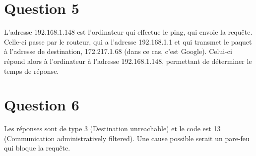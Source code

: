 \section{Question 5}
L'adresse 192.168.1.148 est l'ordinateur qui effectue le ping, qui envoie la requête. Celle-ci passe par le routeur, qui a l'adresse 192.168.1.1 et qui transmet le paquet à l'adresse de destination, 172.217.1.68 (dans ce cas, c'est Google). Celui-ci répond alors à l'ordinateur à l'adresse 192.168.1.148, permettant de déterminer le temps de réponse.
\section{Question 6}
Les réponses sont de type 3 (Destination unreachable) et le code est 13 (Communication administratively filtered).
Une cause possible serait un pare-feu qui bloque la requête.
